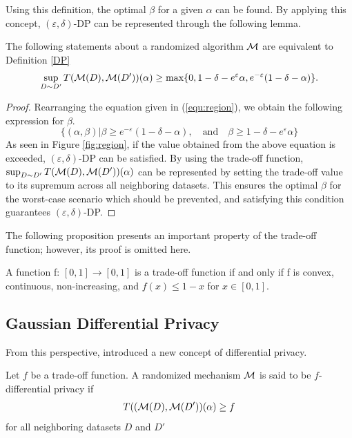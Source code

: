 \documentclass{article}
\begin{document}
Using this definition, the optimal $\beta$ for a given $\alpha$ can be found. By applying this concept, $(\varepsilon,\delta)$-DP can be represented through the following lemma.
\begin{lemma}\label{fdptoadp}
      The following statements about a randomized algorithm ${\mathcal{M}}$ are equivalent to Definition \ref{DP}
      \begin{equation*}
          \sup_{D\sim D'} T({\mathcal{M}}(D),{\mathcal{M}}(D'))(\alpha) \ge \max\{0,1-\delta-e^\varepsilon\alpha,e^{-\varepsilon}(1-\delta-\alpha) \}.
      \end{equation*}
      \begin{proof}
          Rearranging the equation given in (\ref{equ:region}), we obtain the following expression for $\beta$. 
          \begin{equation*}
              \{(\alpha,\beta)|\beta \ge e^{-\varepsilon}(1-\delta-\alpha), \quad \text{and} \quad \beta \ge 1-\delta-e^\varepsilon \alpha \}
          \end{equation*}
          As seen in Figure \ref{fig:region}, if the value obtained from the above equation is exceeded, $(\varepsilon,\delta)$-DP can be satisfied. By using the trade-off function, $\sup_{D\sim D'} T({\mathcal{M}}(D),{\mathcal{M}}(D'))(\alpha)$ can be represented by setting the trade-off value to its supremum across all neighboring datasets. This ensures the optimal $\beta$ for the worst-case scenario which should be prevented, and satisfying this condition guarantees $(\varepsilon,\delta)$-DP.
      \end{proof}
\end{lemma}
The following proposition presents an important property of the trade-off function; however, its proof is omitted here.
\begin{proposition}\label{maketradeoff}
    A function f: $[0,1] \to [0,1]$ is a trade-off function if and only if f is convex, continuous, non-increasing, and $f(x) \le 1-x$ for $x \in [0,1]$.
\end{proposition}

\subsection{Gaussian Differential Privacy}
From this perspective, \cite{dong2022gaussian} introduced a new concept of differential privacy.

\begin{definition}\label{fDP}
    Let $f$ be a trade-off function. A randomized mechanism ${\mathcal{M}}$ is said to be $f$-differential privacy if 
    \begin{equation*}
        T(({\mathcal{M}}(D),{\mathcal{M}}(D'))(\alpha) \ge f
    \end{equation*}
    for all neighboring datasets $D$ and $D'$
\end{definition}
\end{document}
